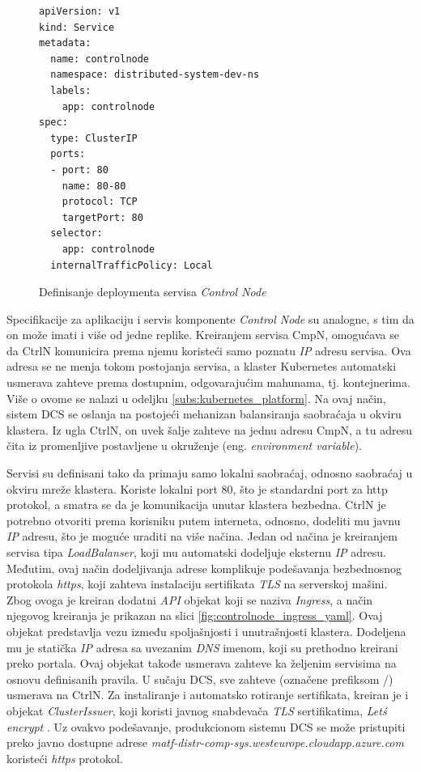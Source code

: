 \documentclass[12pt,oneside]{memoir}
\begin{document}
\begin{figure}[h!]
\centering
\begin{lstlisting}[style=yaml]
apiVersion: v1
kind: Service
metadata:
  name: controlnode
  namespace: distributed-system-dev-ns
  labels:
    app: controlnode
spec:
  type: ClusterIP
  ports:
  - port: 80
    name: 80-80
    protocol: TCP
    targetPort: 80
  selector:
    app: controlnode
  internalTrafficPolicy: Local
\end{lstlisting}
\caption{Definisanje deploymenta servisa \emph{Control Node}}
\label{fig:controlnode_service_yaml}
\end{figure}

Specifikacije za aplikaciju i servis komponente \emph{Control Node} su analogne, s tim da on može imati i više od jedne replike. Kreiranjem servisa CmpN, omogućava se da CtrlN komunicira prema njemu koristeći samo poznatu \emph{IP} adresu servisa. Ova adresa se ne menja tokom postojanja servisa, a klaster Kubernetes automatski usmerava zahteve prema dostupnim, odgovarajućim mahunama, tj. kontejnerima. Više o ovome se nalazi u odeljku \ref{subs:kubernetes_platform}. Na ovaj način, sistem DCS se oslanja na postojeći mehanizan balansiranja saobraćaja u okviru klastera. Iz ugla CtrlN, on uvek šalje zahteve na jednu adresu CmpN, a tu adresu čita iz promenljive postavljene u okruženje (eng. \emph{environment variable}).

Servisi su definisani tako da primaju samo lokalni saobraćaj, odnosno saobraćaj u okviru mreže klastera. Koriste lokalni port 80, što je standardni port za http protokol, a smatra se da je komunikacija unutar klastera bezbedna. CtrlN je potrebno otvoriti prema korisniku putem interneta, odnosno, dodeliti mu javnu \emph{IP} adresu, što je moguće uraditi na više načina. Jedan od načina je kreiranjem servisa tipa \emph{LoadBalanser}, koji mu automatski dodeljuje eksternu \emph{IP} adresu. Međutim, ovaj način dodeljivanja adrese komplikuje podešavanja bezbednosnog protokola \emph{https}, koji zahteva instalaciju sertifikata \emph{TLS} na serverskoj mašini. Zbog ovoga je kreiran dodatni \emph{API} objekat koji se naziva \emph{Ingress}, a način njegovog kreiranja je prikazan na slici \ref{fig:controlnode_ingress_yaml}. Ovaj objekat predstavlja vezu između spoljašnjosti i unutrašnjosti klastera. Dodeljena mu je statička \emph{IP} adresa sa uvezanim \emph{DNS} imenom, koji su prethodno kreirani preko portala. Ovaj objekat takođe usmerava zahteve ka željenim servisima na osnovu definisanih pravila. U sučaju DCS, sve zahteve (označene prefiksom /) usmerava na CtrlN. Za instaliranje i automatsko rotiranje sertifikata, kreiran je i objekat \emph{ClusterIssuer}, koji koristi javnog snabdevača \emph{TLS} sertifikatima, \emph{Let\'s encrypt} \cite{letsencrypt}. Uz ovakvo podešavanje, produkcionom sistemu DCS se može pristupiti preko javno dostupne adrese \emph{matf-distr-comp-sys.westeurope.cloudapp.azure.com} koristeći \emph{https} protokol.
\end{document}
